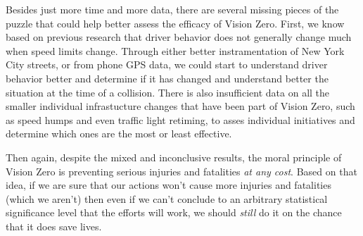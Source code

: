 \documentclass[10pt,journal,compsoc]{IEEEtran}
\begin{document}
Besides just more time and more data, there are several missing pieces of the puzzle that could help better assess the efficacy of Vision Zero.  First, we know based on previous research that driver behavior does not generally change much when speed limits change.  Through either better instramentation of New York City streets, or from phone GPS data, we could start to understand driver behavior better and determine if it has changed and understand better the situation at the time of a collision.  There is also insufficient data on all the smaller individual infrastucture changes that have been part of Vision Zero, such as speed humps and even traffic light retiming, to asses individual initiatives and determine which ones are the most or least effective.  

Then again, despite the mixed and inconclusive results, the moral principle of Vision Zero is preventing serious injuries and fatalities \textit{at any cost}.  Based on that idea, if we are sure that our actions won't cause more injuries and fatalities (which we aren't) then even if we can't conclude to an arbitrary statistical significance level that the efforts will work, we should \textit{still} do it on the chance that it does save lives.    



%
\end{document}
